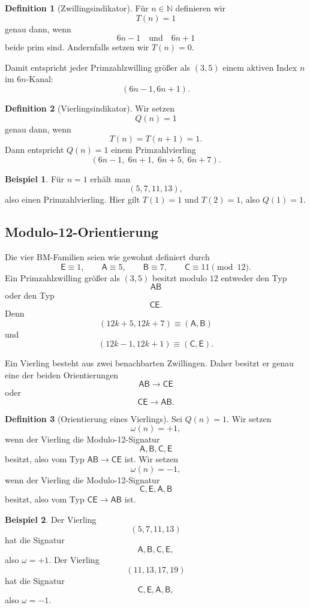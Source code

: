 \documentclass[11pt,a4paper]{article}
\theoremstyle{definition}
\newtheorem{definition}{Definition}
\newtheorem{example}{Beispiel}
\newcommand{\N}{\mathbb{N}}
\newcommand{\E}{\mathsf{E}}
\newcommand{\A}{\mathsf{A}}
\newcommand{\B}{\mathsf{B}}
\newcommand{\C}{\mathsf{C}}
\newcommand{\CE}{\mathsf{CE}}
\newcommand{\AB}{\mathsf{AB}}
\begin{document}
\begin{definition}[Zwillingsindikator]
Für $n\in\N$ definieren wir
\[
T(n)=1
\]
genau dann, wenn
\[
6n-1 \quad\text{und}\quad 6n+1
\]
beide prim sind. Andernfalls setzen wir $T(n)=0$.
\end{definition}

Damit entspricht jeder Primzahlzwilling größer als $(3,5)$ einem aktiven Index $n$ im $6n$-Kanal:
\[
(6n-1,6n+1).
\]

\begin{definition}[Vierlingsindikator]
Wir setzen
\[
Q(n)=1
\]
genau dann, wenn
\[
T(n)=T(n+1)=1.
\]
Dann entspricht $Q(n)=1$ einem Primzahlvierling
\[
(6n-1,\;6n+1,\;6n+5,\;6n+7).
\]
\end{definition}

\begin{example}
Für $n=1$ erhält man
\[
(5,7,11,13),
\]
also einen Primzahlvierling. Hier gilt $T(1)=1$ und $T(2)=1$, also $Q(1)=1$.
\end{example}

\subsection{Modulo-12-Orientierung}

Die vier BM-Familien seien wie gewohnt definiert durch
\[
\E\equiv 1,\qquad \A\equiv 5,\qquad \B\equiv 7,\qquad \C\equiv 11 \pmod {12}.
\]
Ein Primzahlzwilling größer als $(3,5)$ besitzt modulo $12$ entweder den Typ
\[
\AB
\]
oder den Typ
\[
\CE.
\]
Denn
\[
(12k+5,12k+7)\equiv (\A,\B)
\]
und
\[
(12k-1,12k+1)\equiv (\C,\E).
\]

Ein Vierling besteht aus zwei benachbarten Zwillingen. Daher besitzt er genau eine der beiden Orientierungen
\[
\AB\to\CE
\]
oder
\[
\CE\to\AB.
\]

\begin{definition}[Orientierung eines Vierlings]
Sei $Q(n)=1$. Wir setzen
\[
\omega(n)=+1,
\]
wenn der Vierling die Modulo-12-Signatur
\[
\A,\B,\C,\E
\]
besitzt, also vom Typ $\AB\to\CE$ ist. Wir setzen
\[
\omega(n)=-1,
\]
wenn der Vierling die Modulo-12-Signatur
\[
\C,\E,\A,\B
\]
besitzt, also vom Typ $\CE\to\AB$ ist.
\end{definition}

\begin{example}
Der Vierling
\[
(5,7,11,13)
\]
hat die Signatur
\[
\A,\B,\C,\E,
\]
also $\omega=+1$. Der Vierling
\[
(11,13,17,19)
\]
hat die Signatur
\[
\C,\E,\A,\B,
\]
also $\omega=-1$.
\end{example}
\end{document}
